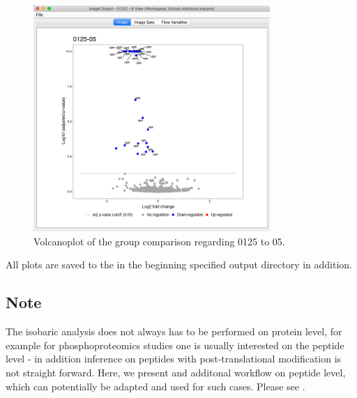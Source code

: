 \begin{figure}[htbp]
  \centering
 \includegraphics[width=0.80\textwidth]{graphics/isobaric/isobaric_img_output_knime.png}
  \caption{Volcanoplot of the group comparison regarding 0125 to 05.}
  \label{fig:isobaric_volcanoplot}
\end{figure}

\noindent  All plots are saved to the in the beginning specified output directory in addition. 

\subsection{Note}
The isobaric analysis does not always has to be performed on protein level, for example for phosphoproteomics studies one is usually  interested on the peptide level - in addition inference on peptides with post-translational modification is not straight forward. Here, we present and additonal workflow on peptide level, which can potentially be adapted and used for such cases. 
Please see .




